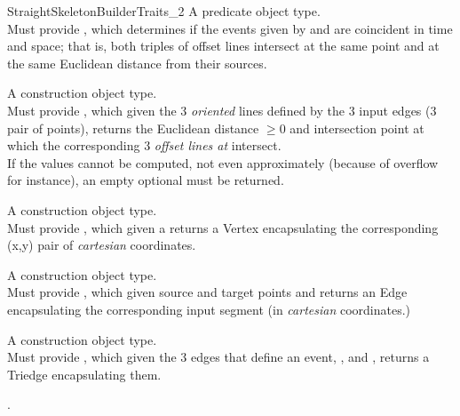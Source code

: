 \begin{ccRefConcept}{StraightSkeletonBuilderTraits_2}
{A predicate object type.\\
Must provide , which determines if the events given by  and  are coincident in time and space; that is, both triples of offset lines intersect at the same point and at the same Euclidean distance from their sources.\\
}

{A construction object type.\\
Must provide , which given the 3 \textit{oriented} lines defined by the 3 input edges (3 pair of points), returns the Euclidean distance  $\geq 0$ and intersection point at which the corresponding 3 \textit{offset lines at } intersect.\\
If the values cannot be computed, not even approximately (because of overflow for instance), an empty optional must be returned.\\
}

{A construction object type.\\
Must provide , which given a   returns a Vertex encapsulating the corresponding (x,y) pair of \textit{cartesian} coordinates.}

{A construction object type.\\
Must provide , which given source and target points  and  returns an Edge encapsulating the corresponding input segment (in \textit{cartesian} coordinates.)}

{A construction object type.\\
Must provide , which given the 3 edges that define an event, ,  and , returns a Triedge encapsulating them.}

\ccHasModels

.

\ccSeeAlso

\\
\\

\end{ccRefConcept}

